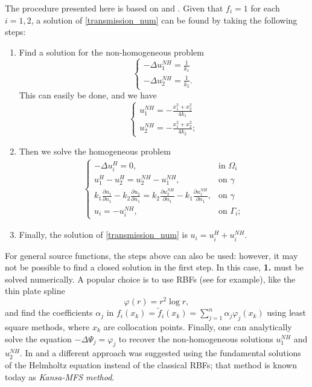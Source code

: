 The procedure presented here is based on \cite{alves2005new} and \cite{alves2021domain}. Given that \(f_i = 1\) for each \(i=1, 2\), a solution of \eqref{transmission_num} can be found by taking the following steps:
\begin{enumerate}
    \item Find a solution for the non-homogeneous problem
    \[
        \begin{cases}
            -\Delta u_1^{NH} = \frac{1}{k_1}\\
            -\Delta u_2^{NH} = \frac{1}{k_2}.
        \end{cases}
    \]
    This can easily be done, and we have
    \[
        \begin{cases}
            u_1^{NH} = -\frac{x_1^2 + x_2^2}{4k_1}\\
            u_2^{NH} = -\frac{x_1^2 + x_2^2}{4k_2};
        \end{cases}
    \]
    \item Then we solve the homogeneous problem
    \begin{align}\label{transmission_num_homo}
        \begin{cases}
        - \Delta u_i^H = 0, & \text{in }\Omega_i\\
        u_1^H - u_2^H = u_2^{NH}- u_1^{NH}, & \text{on }\gamma\\
        k_1 \frac{\partial u_1}{\partial n_1} - k_2 \frac{\partial u_2}{\partial n_1} = k_2 \frac{\partial u_2^{NH}}{\partial n_1}  - k_1 \frac{\partial u_1^{NH}}{\partial n_1}, & \text{on }\gamma\\
        u_i = - u_i^{NH}, & \text{on }\Gamma_i;
        \end{cases}
    \end{align}
    \item Finally, the solution of \eqref{transmission_num} is \(u_i = u_i^H + u_i^{NH}\).
\end{enumerate}
For general source functions, the steps above can also be used: however, it may not be possible to find a closed solution in the first step. In this case, \textbf{1.} must be solved numerically. A popular choice is to use \acp{RBF} (see \cite{golberg1996improved} for example), like the thin plate spline
\[
    \varphi(r) = r^2 \log r,     
\]
and find the coefficients \(\alpha_j\) in \(f_i(x_k) = \tilde{f}_i(x_k) = \sum_{j=1}^{n} \alpha_j \varphi_j(x_k)\) using least square methods, where \(x_k\) are collocation points. Finally, one can analytically solve the equation \(-\Delta \Psi_j = \varphi_j\) to recover the non-homogeneous solutions \(u_1^{NH}\) and \(u_2^{NH}\). In \cite{alves2005new} and \cite{alves2021domain} a different approach was suggested using the fundamental solutions of the Helmholtz equation instead of the classical \acp{RBF}; that method is known today as \textit{Kansa-MFS method}.

